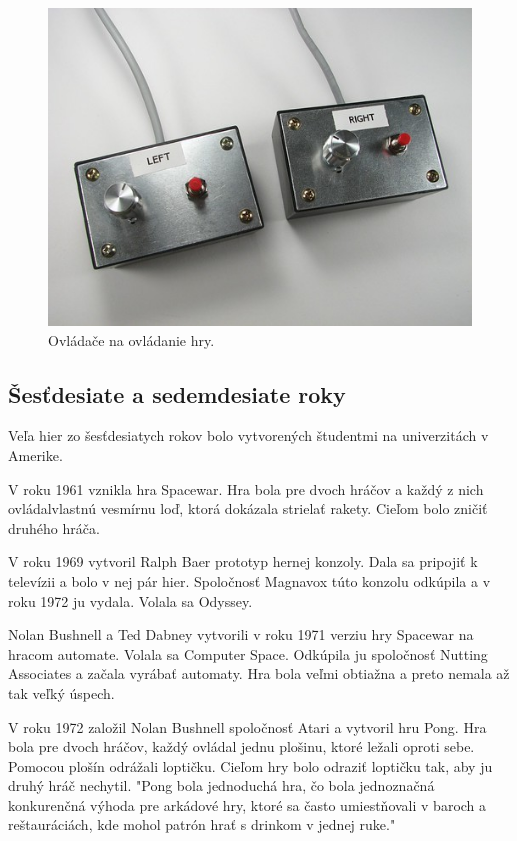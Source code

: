 \documentclass[10pt,oneside,slovak,a4paper]{article}
\begin{document}
\begin{figure}[tbh]
\centering
\includegraphics[scale=0.35]{tenis2.jpg}
\caption{Ovládače na ovládanie hry.}
\label{tenis2}
\end{figure}

\subsection{Šesťdesiate a sedemdesiate roky} \label{sedemdesiate}

Veľa hier zo šesťdesiatych rokov bolo vytvorených študentmi na univerzitách v Amerike. 

V roku 1961 vznikla hra Spacewar. Hra bola pre dvoch hráčov a každý z nich ovládalvlastnú vesmírnu loď, ktorá dokázala strielať rakety. Cieľom bolo zničiť druhého hráča.

V roku 1969 vytvoril Ralph Baer prototyp hernej konzoly. Dala sa pripojiť k televízii a bolo v nej pár hier. Spoločnosť Magnavox túto konzolu odkúpila a v roku 1972 ju vydala. Volala sa Odyssey.

Nolan Bushnell a Ted Dabney vytvorili v roku 1971 verziu hry Spacewar na hracom automate. Volala sa Computer Space. Odkúpila ju spoločnosť Nutting Associates a začala vyrábať automaty. Hra bola veľmi obtiažna a preto nemala až tak veľký úspech.

V roku 1972 založil Nolan Bushnell spoločnosť Atari a vytvoril hru Pong. Hra bola pre dvoch hráčov, každý ovládal jednu plošinu, ktoré ležali oproti sebe. Pomocou plošín odrážali loptičku. Cieľom hry bolo odraziť loptičku tak, aby ju druhý hráč nechytil. "Pong bola jednoduchá hra, čo bola jednoznačná konkurenčná výhoda pre arkádové hry, ktoré sa často umiestňovali v baroch a reštauráciách, kde mohol patrón hrať s drinkom v jednej ruke."\cite{Lowood}
\end{document}
